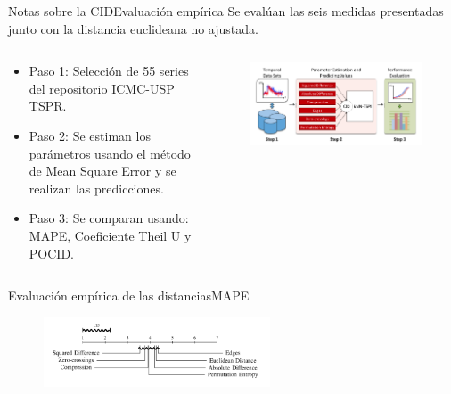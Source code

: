 \documentclass[12pt, aspectratio=169]{beamer} %
\begin{document}
\begin{frame}{Notas sobre la CID}{Evaluación empírica}
  Se evalúan las seis medidas presentadas junto con la distancia euclideana no ajustada.
  \begin{columns}
    \begin{column}{0.5\textwidth}
      \begin{itemize}
        \item Paso 1: Selección de 55 series del repositorio ICMC-USP TSPR.
        \item Paso 2: Se estiman los parámetros usando el método de Mean Square Error y se realizan las predicciones.
        \item Paso 3: Se comparan usando: MAPE, Coeficiente Theil U y POCID.
      \end{itemize}
    \end{column}

    \begin{column}{0.5\textwidth}
      \begin{figure}
        \includegraphics[width=\textwidth]{20210313_3_evaluacion_cid.png}
      \end{figure}
    \end{column}

    \end{columns}
  
\end{frame}


\begin{frame}{Evaluación empírica de las distancias}{MAPE}
  \begin{figure}
    \includegraphics[width=0.6\textwidth]{20210313_4_nemenyi_distancias_cd.png}
  \end{figure}
\end{frame}
\end{document}
